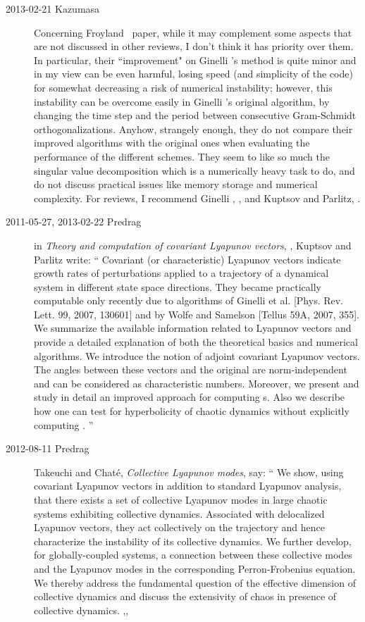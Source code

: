 \begin{description}
\item[2013-02-21 Kazumasa]
Concerning Froyland \etal\ paper, while it may
complement some aspects that are not discussed in other reviews, I
don't think it has priority over them. In particular, their
``improvement" on Ginelli \etal's method is quite minor and in my view
can be even harmful, losing speed (and simplicity of the code) for
somewhat decreasing a risk of numerical instability; however, this
instability can be overcome easily in Ginelli \etal's original
algorithm, by changing the time step and the period between
consecutive Gram-Schmidt orthogonalizations. Anyhow, strangely
enough, they do not compare their improved algorithms with the
original ones when evaluating the performance of the different
schemes. They seem to like so much the singular value decomposition
which is a numerically heavy task to do, and do not discuss practical
issues like memory storage and numerical complexity.
For reviews, I recommend Ginelli \etal, ,
and Kuptsov and Parlitz,
 .

\item[2011-05-27, 2013-02-22 Predrag] in
\emph{Theory and computation of covariant Lyapunov vectors},
, Kuptsov and Parlitz write: `` Covariant
(or characteristic) Lyapunov vectors indicate growth rates of
perturbations applied to a trajectory of a dynamical system in
different state space directions. They became practically computable
only recently due to algorithms of Ginelli et al. [Phys. Rev. Lett.
99, 2007, 130601] and by Wolfe and Samelson [Tellus 59A, 2007, 355].
We summarize the available information related to Lyapunov vectors
and provide a detailed explanation of both the theoretical basics and
numerical algorithms. We introduce the notion of adjoint covariant
Lyapunov vectors. The angles between these vectors and the original
{\cLvs} are norm-independent and can be considered as
characteristic numbers. Moreover, we present and study in detail an
improved approach for computing {\cLvs}s. Also we
describe how one can test for hyperbolicity of chaotic dynamics
without explicitly computing {\cLvs}. ''

\item[2012-08-11 Predrag]
Takeuchi and Chat\'{e},
\emph{Collective {Lyapunov} modes},
 say: ``
We show, using covariant Lyapunov vectors in addition to standard
Lyapunov analysis, that there exists a set of collective Lyapunov modes
in large chaotic systems exhibiting collective dynamics. Associated with
delocalized Lyapunov vectors, they act collectively on the trajectory and
hence characterize the instability of its collective dynamics. We further
develop, for globally-coupled systems, a connection between these
collective modes and the Lyapunov modes in the corresponding
Perron-Frobenius equation. We thereby address the fundamental question of
the effective dimension of collective dynamics and discuss the
extensivity of chaos in presence of collective dynamics.
,,


\end{description}
